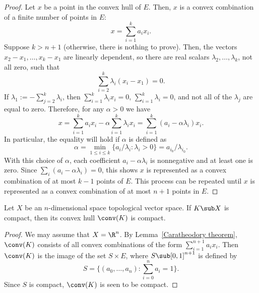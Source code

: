 \begin{proof}
Let $x$ be a point in the convex hull of $E$. Then, $x$ is a convex combination of a finite number of points in $E$:
\[x=\sum_{i=1}^{k}a_ix_i.\]
Suppose $k>n+1$ (otherwise, there is nothing to prove). Then, the vectors $x_2-x_1,\dots,x_k-x_1$ are linearly dependent, so there are real scalars $\lambda_2,\dots,\lambda_k$, not all zero, such that
\[\sum_{i=2}^{k}\lambda_i(x_i-x_1)=0.\]
If $\lambda_1:=-\sum_{j=2}^{k}\lambda_i$, then $\sum_{i=1}^{k}\lambda_ix_i=0$, $\sum_{i=1}^{k}\lambda_i=0$, and not all of the $\lambda_j$ are equal to zero. Therefore, for any $\alpha>0$ we have
\[x=\sum_{i=1}^{k}a_ix_i-\alpha\sum_{i=1}^{k}\lambda_ix_i=\sum_{i=1}^{k}(a_i-\alpha\lambda_i)x_i.\]
In particular, the equality will hold if $\alpha$ is defined as
\[\alpha=\min_{1\leq i\leq k}\{a_i/\lambda_i:\lambda_i>0\}=a_{i_0}/\lambda_{i_0}.\]
With this choice of $\alpha$, each coefficient $a_i-\alpha\lambda_i$ is nonnegative and at least one is zero. Since $\sum_i(a_i-\alpha\lambda_i)=0$, this shows $x$ is represented as a convex combination of at most $k-1$ points of $E$. This process can be repeated until $x$ is represented as a convex combination of at most $n+1$ points in $E$.
\end{proof}
\begin{proposition}
Let $X$ be an $n$-dimensional space topological vector space. If $K\sub X$ is compact, then its convex hull $\conv(K)$ is compact.
\end{proposition}
\begin{proof}
We may assume that $X=\R^n$. By Lemma~\ref{Caratheodory theorem}, $\conv(K)$ consists of all convex combinations of the form $\sum_{i=1}^{n+1}a_ix_i$. Then $\conv(K)$ is the image of the set $S\times E$, where $S\sub[0,1]^{n+1}$ is defined by
\[S=\{(a_0,\dots,a_n):\sum_{i=0}^{n}a_i=1\}.\]
Since $S$ is compact, $\conv(K)$ is seen to be compact.
\end{proof}
